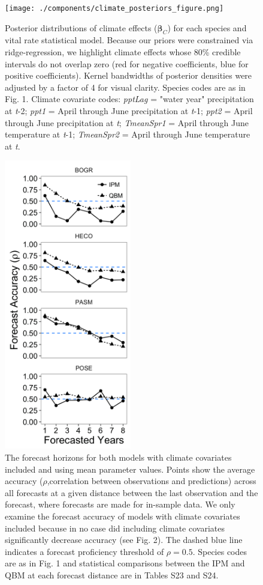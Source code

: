 \documentclass[12pt,]{article}
\begin{document}
\begin{figure}[!ht]
  \centering
      \texttt{[image: ./components/climate\_posteriors\_figure.png]}
  \caption{Posterior distributions of climate effects ($\boldsymbol{\beta}_C$) for each species and vital rate statistical model. Because our priors were constrained via ridge-regression, we highlight climate effects whose 80\% credible intervals do not overlap zero (red for negative coefficients, blue for positive coefficients). Kernel bandwidths of posterior densities were adjusted by a factor of 4 for visual clarity. Species codes are as in Fig. 1. Climate covariate codes: \emph{pptLag} = "water year" precipitation at \emph{t}-2; \emph{ppt1} = April through June precipitation at \emph{t}-1; \emph{ppt2} = April through June precipitation at \emph{t}; \emph{TmeanSpr1} = April through June temperature at \emph{t}-1; \emph{TmeanSpr2} = April through June temperature at \emph{t}.}
\end{figure}

\newpage{}

\begin{figure}[!ht]
  \centering
      \includegraphics[height=5in]{./components/forecast_horizon.png}
  \caption{The forecast horizons for both models with climate covariates included and using mean parameter values. Points show the average accuracy ($\rho$,correlation between observations and predictions) across all forecasts at a given distance between the last observation and the forecast, where forecasts are made for in-sample data. We only examine the forecast accuracy of models with climate covariates included because in no case did including climate covariates significantly decrease accuracy (see Fig. 2). The dashed blue line indicates a forecast proficiency threshold of $\rho = 0.5$. Species codes are as in Fig. 1 and statistical comparisons between the IPM and QBM at each forecast distance are in Tables S23 and S24.}
\end{figure}
\end{document}
